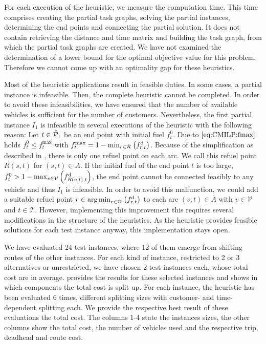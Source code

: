 For each execution of the heuristic, we measure the computation time. This time comprises creating the partial task graphs, solving the partial instances, determining the end points and connecting the partial solution. It does not contain retrieving the distance and time matrix and building the task graph, from which the partial task graphs are created. We have not examined the determination of a lower bound for the optimal objective value for this problem. Therefore we cannot come up with an optimality gap for these heuristics.

Most of the heuristic applications result in feasible duties. In some cases, a partial instance is infeasible. Then, the complete heuristic cannot be completed. In order to avoid these infeasibilities, we have ensured that the number of available vehicles is sufficient for the number of customers. Nevertheless, the first partial instance $I_1$ is infeasible in several executions of the heuristic with the following reason: Let $t\in\hat{\mathcal{P}}_1$ be an end point with initial fuel $f^0_t$. Due to $\eqref{eq:CMILP:fmax}$ holds ${f^0_t\leq f^{\max}_t}$ with ${f^{\max}_t = 1 - \min_{r\in\mathcal{R}}\left(f^{\operatorname{d}}_{r,t}\right)}$. Because of the simplification as described in , there is only one refuel point on each arc. We call this refuel point $R(s,t)$ for ${(s,t)\in\overline{A}}$. If the initial fuel of the end point $t$ is too large, \ie ${f^0_t > 1 - \max_{v\in\mathcal{V}}\left(f^{\operatorname{d}}_{R(v,t),t}\right)}$, the end point cannot be connected feasibly to any vehicle and thus $I_1$ is infeasible. In order to avoid this malfunction, we could add a suitable refuel point ${r\in\operatorname*{arg\,min}_{r\in\mathcal{R}}\left(f^{\operatorname{d}}_{r,t}\right)}$ to each arc ${(v,t)\in\overline{A}}$ with ${v\in\mathcal{V}}$ and ${t\in\mathcal{T}}$. However, implementing this improvement this requires several modifications in the structure of the heuristics. As the heuristic provides feasible solutions for each test instance anyway, this implementation stays open.

We have evaluated 24 test instances, where 12 of them emerge from shifting routes of the other instances. For each kind of instance, \ie restricted to 2 or 3 alternatives or unrestricted, we have chosen 2 test instances each, whose total cost are in average.  provides the results for these selected instances and shows in which components the total cost is split up. For each instance, the heuristic has been evaluated 6 times,  different splitting sizes with customer- and time-dependent splitting each. We provide the respective best result of these evaluations \wrt the total cost. The columns 1-4 state the instances sizes, the other columns show the total cost, the number of vehicles used and the respective trip, deadhead and route cost.


